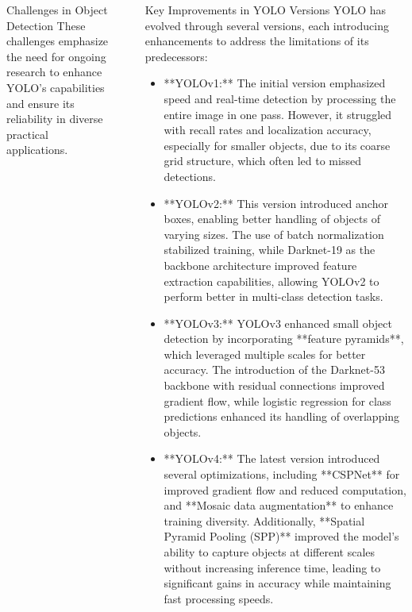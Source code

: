 \documentclass[final]{beamer}
\newlength{\sepwidth}
\newlength{\colwidth}
\newcommand{\separatorcolumn}{\begin{column}{\sepwidth}\end{column}}
\begin{document}
\begin{frame}[t]
\begin{columns}[t]
\begin{column}{\colwidth}
\begin{block}{Challenges in Object Detection}
    These challenges emphasize the need for ongoing research to enhance YOLO’s capabilities and ensure its reliability in diverse practical applications.
\end{block}



\end{column}

\separatorcolumn

\begin{column}{\colwidth}

\begin{block}{Key Improvements in YOLO Versions}
    YOLO has evolved through several versions, each introducing enhancements to address the limitations of its predecessors:

    \begin{itemize}
      \item **YOLOv1:** The initial version emphasized speed and real-time detection by processing the entire image in one pass. However, it struggled with recall rates and localization accuracy, especially for smaller objects, due to its coarse grid structure, which often led to missed detections.

      \item **YOLOv2:** This version introduced anchor boxes, enabling better handling of objects of varying sizes. The use of batch normalization stabilized training, while Darknet-19 as the backbone architecture improved feature extraction capabilities, allowing YOLOv2 to perform better in multi-class detection tasks.

      \item **YOLOv3:** YOLOv3 enhanced small object detection by incorporating **feature pyramids**, which leveraged multiple scales for better accuracy. The introduction of the Darknet-53 backbone with residual connections improved gradient flow, while logistic regression for class predictions enhanced its handling of overlapping objects.

      \item **YOLOv4:** The latest version introduced several optimizations, including **CSPNet** for improved gradient flow and reduced computation, and **Mosaic data augmentation** to enhance training diversity. Additionally, **Spatial Pyramid Pooling (SPP)** improved the model's ability to capture objects at different scales without increasing inference time, leading to significant gains in accuracy while maintaining fast processing speeds.


\end{itemize}
\end{block}
\end{column}
\end{columns}
\end{frame}
\end{document}
